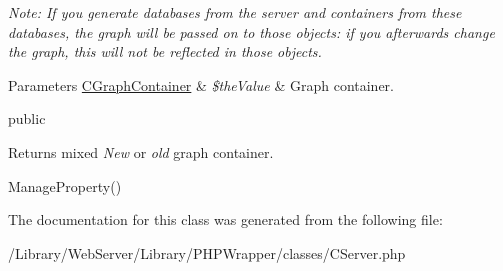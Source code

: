 {\itshape Note\-: If you generate databases from the server and containers from these databases, the graph will be passed on to those objects\-: if you afterwards change the graph, this will not be reflected in those objects.}


\begin{DoxyParams}[1]{Parameters}
\hyperlink{class_c_graph_container}{C\-Graph\-Container} & {\em \$the\-Value} & Graph container.\\
\hline
\end{DoxyParams}
public \begin{DoxyReturn}{Returns}
mixed {\itshape New} or {\itshape old} graph container.
\end{DoxyReturn}
Manage\-Property() 

The documentation for this class was generated from the following file\-:\begin{DoxyCompactItemize}
\item 
/\-Library/\-Web\-Server/\-Library/\-P\-H\-P\-Wrapper/classes/C\-Server.\-php\end{DoxyCompactItemize}
